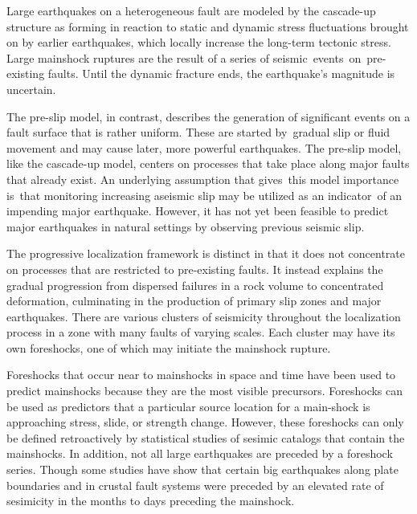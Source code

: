 \documentclass[12pt]{article} %
\theoremstyle{plain}
\begin{document}
	Large earthquakes on a heterogeneous fault are modeled by the cascade-up structure as forming in reaction to static and dynamic stress fluctuations brought on by earlier earthquakes, which locally increase the long-term tectonic stress. Large mainshock ruptures are the result of a series of seismic events on pre-existing faults. Until the dynamic fracture ends, the earthquake's magnitude is uncertain.

	The pre-slip model, in contrast, describes the generation of significant events on a fault surface that is rather uniform. These are started by gradual slip or fluid movement and may cause later, more powerful earthquakes. The pre-slip model, like the cascade-up model, centers on processes that take place along major faults that already exist. An underlying assumption that gives this model importance is that monitoring increasing aseismic slip may be utilized as an indicator of an impending major earthquake. However, it has not yet been feasible to predict major earthquakes in natural settings by observing previous seismic slip.
	
	The progressive localization framework is distinct in that it does not concentrate on processes that are restricted to pre-existing faults. It instead explains the gradual progression from dispersed failures in a rock volume to concentrated deformation, culminating in the production of primary slip zones and major earthquakes. There are various clusters of seismicity throughout the localization process in a zone with many faults of varying scales. Each cluster may have its own foreshocks, one of which may initiate the mainshock rupture.
	
	Foreshocks that occur near to mainshocks in space and time have been used to predict mainshocks because they are the most visible precursors. Foreshocks can be used as predictors that a particular source location for a main-shock is approaching stress, slide, or strength change. However, these foreshocks can only be defined retroactively by statistical studies of sesimic catalogs that contain the mainshocks. In addition, not all large earthquakes are preceded by a foreshock series. Though some studies have show that certain big earthquakes along plate boundaries and in crustal fault systems were preceded by an elevated rate of sesimicity in the months to days preceding the mainshock. 
	
\end{document}
